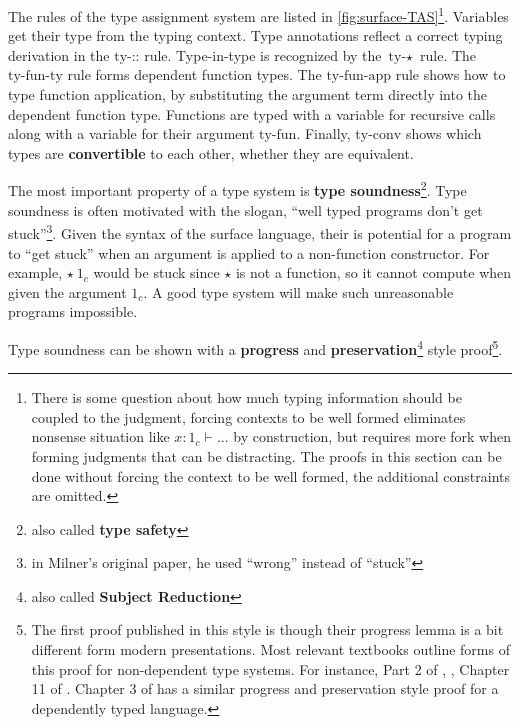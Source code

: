 The rules of the type assignment system are listed in \ref{fig:surface-TAS}\footnote{There is some question about how much typing information should be coupled to the judgment, forcing contexts to be well formed eliminates nonsense situation like $x:1_{c}\vdash...$ by construction, but requires more fork when forming judgments that can be distracting.
The proofs in this section can be done without forcing the context to be well formed, the additional constraints are omitted.}.
Variables get their type from the typing context.
Type annotations reflect a correct typing derivation in the $\textrm{ty-::}$ rule.
Type-in-type is recognized by the $\textrm{ty-}\star$ rule.
The $\textrm{ty-fun-ty}$ rule forms dependent function types.
The $\textrm{ty-fun-app}$ rule shows how to type function application, by substituting the argument term directly into the dependent function type.
Functions are typed with a variable for recursive calls along with a variable for their argument $\textrm{ty-fun}$.
Finally, $\textrm{ty-conv}$ shows which types are \textbf{convertible} to each other, whether they are equivalent.

The most important property of a type system is \textbf{type soundness}\footnote{also called \textbf{type safety}}.
Type soundness is often motivated with the slogan, ``well typed programs don't get stuck''\cite{MILNER1978348}\footnote{in Milner's original paper, he used ``wrong'' instead of ``stuck''}.
Given the syntax of the surface language, their is potential for a program to ``get stuck'' when an argument is applied to a non-function constructor.
For example, $\star\ 1_{c}$ would be stuck since $\star$ is not a function, so it cannot compute when given the argument $1_{c}$.
A good type system will make such unreasonable programs impossible.

Type soundness can be shown with a \textbf{progress} and \textbf{preservation}\footnote{also called  \textbf{Subject Reduction}} style proof\cite{WRIGHT199438}\footnote{The first proof published in this style is \cite{WRIGHT199438} though their progress lemma is a bit different form modern presentations.
Most relevant textbooks outline forms of this proof for non-dependent type systems.
For instance, Part 2 of \cite{pierce2002types}, \cite{KOKKE2020102440}, Chapter 11 of \cite{chlipala2017formal}.
Chapter 3 of \cite{sjoberg2015dependently} has a similar progress and preservation style proof for a dependently typed language.}.

